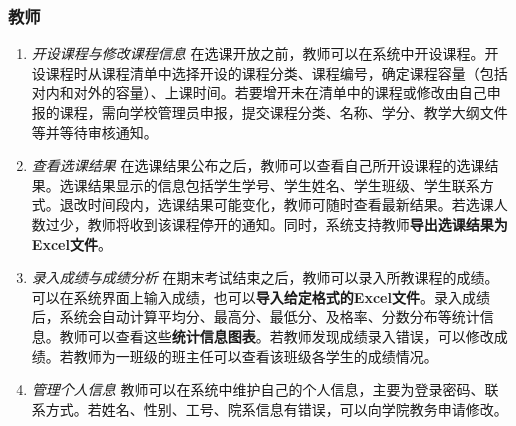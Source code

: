 \subsubsection{教师}
\begin{enumerate}
    \item \textit{开设课程与修改课程信息} \quad 在选课开放之前，教师可以在系统中开设课程。开设课程时从课程清单中选择开设的课程分类、课程编号，确定课程容量（包括对内和对外的容量）、上课时间。若要增开未在清单中的课程或修改由自己申报的课程，需向学校管理员申报，提交课程分类、名称、学分、教学大纲文件等并等待审核通知。
    \item \textit{查看选课结果} \quad 在选课结果公布之后，教师可以查看自己所开设课程的选课结果。选课结果显示的信息包括学生学号、学生姓名、学生班级、学生联系方式。退改时间段内，选课结果可能变化，教师可随时查看最新结果。若选课人数过少，教师将收到该课程停开的通知。同时，系统支持教师\textbf{导出选课结果为Excel文件}。
    \item \textit{录入成绩与成绩分析} \quad 在期末考试结束之后，教师可以录入所教课程的成绩。可以在系统界面上输入成绩，也可以\textbf{导入给定格式的Excel文件}。录入成绩后，系统会自动计算平均分、最高分、最低分、及格率、分数分布等统计信息。教师可以查看这些\textbf{统计信息图表}。若教师发现成绩录入错误，可以修改成绩。若教师为一班级的班主任可以查看该班级各学生的成绩情况。
    \item \textit{管理个人信息} \quad 教师可以在系统中维护自己的个人信息，主要为登录密码、联系方式。若姓名、性别、工号、院系信息有错误，可以向学院教务申请修改。
\end{enumerate}

